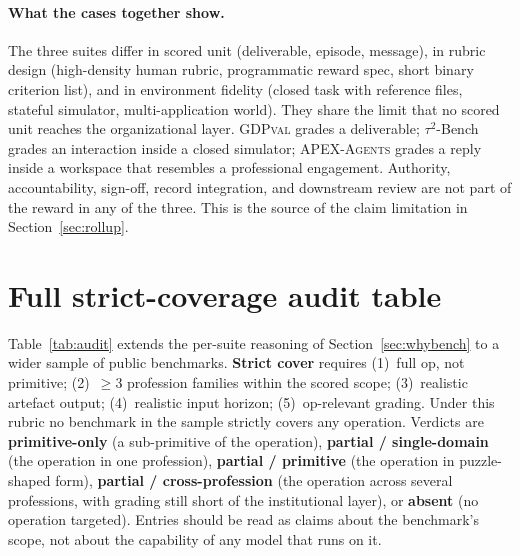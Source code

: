 \documentclass{article}
\begin{document}
\paragraph{What the cases together show.}
The three suites differ in scored unit (deliverable, episode, message), in rubric design (high-density human rubric, programmatic reward spec, short binary criterion list), and in environment fidelity (closed task with reference files, stateful simulator, multi-application world).
They share the limit that no scored unit reaches the organizational layer.
\textsc{GDPval} grades a deliverable; $\tau^2$-Bench grades an interaction inside a closed simulator; \textsc{APEX-Agents} grades a reply inside a workspace that resembles a professional engagement.
Authority, accountability, sign-off, record integration, and downstream review are not part of the reward in any of the three.
This is the source of the claim limitation in Section~\ref{sec:rollup}.

\section{Full strict-coverage audit table}
\label{app:audit-table}

Table~\ref{tab:audit} extends the per-suite reasoning of Section~\ref{sec:whybench} to a wider sample of public benchmarks.
\textbf{Strict cover} requires (1)~full op, not primitive; (2)~$\geq 3$ profession families within the scored scope; (3)~realistic artefact output; (4)~realistic input horizon; (5)~op-relevant grading.
Under this rubric no benchmark in the sample strictly covers any operation.
Verdicts are \textbf{primitive-only} (a sub-primitive of the operation), \textbf{partial / single-domain} (the operation in one profession), \textbf{partial / primitive} (the operation in puzzle-shaped form), \textbf{partial / cross-profession} (the operation across several professions, with grading still short of the institutional layer), or \textbf{absent} (no operation targeted).
Entries should be read as claims about the benchmark's scope, not about the capability of any model that runs on it.
\end{document}
